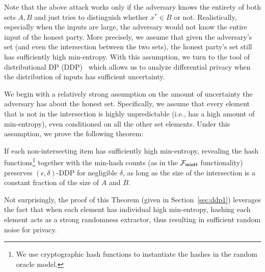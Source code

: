 Note that the above attack works only if the adversary knows the entirety of both sets $A, B$ and just tries to distinguish whether
$x^* \in B$ or not.
Realistically, especially when the inputs are large, the adversary would not know the entire input of the honest party.
More precisely, we assume that given the adversary's set (and even the intersection between the two sets), the honest party's set still has sufficiently high min-entropy.  With this assumption, we turn to the tool of distributional DP (DDP)~\cite{FOCS:BGKS13} which allows us to analyze differential privacy when the distribution of inputs has sufficient uncertainty.

 We begin with a relatively strong assumption on the amount of uncertainty the adversary has about the honest set.  Specifically, we assume that every element that is not in the intersection is highly unpredictable (i.e., has a high amount of min-entropy), even conditioned on all the other set elements.  
 Under this assumption, we prove the following theorem:

 \begin{theorem}[Informal]
     If each non-intersecting item has sufficiently high min-entropy, revealing the hash functions\footnote{We use cryptographic hash functions to instantiate the hashes in the random oracle model.} together with the min-hash counts (as in the ${\mathcal{F}_\mathsf{minH}}$ functionality) preserves $(\epsilon,\delta)$-DDP for negligible $\delta$, as long as the size of the intersection is  a constant fraction of the size of $A$ and $B$.
 \end{theorem}

 Not surprisingly, the proof of this Theorem (given in Section~\ref{sec:ddp1}) leverages the fact that when each element has individual high min-entropy, hashing each element acts as a strong randomness extractor, thus resulting in sufficient random noise for privacy.


